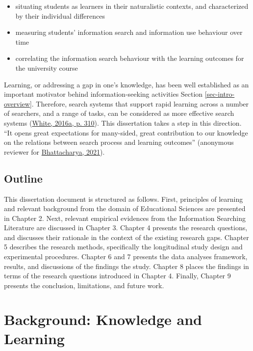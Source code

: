 \documentclass[letterpaper, nobind]{templates/ociamthesis}
\providecommand{\tightlist}{%
  \setlength{\itemsep}{0pt}\setlength{\parskip}{0pt}}
\begin{document}
\begin{itemize}
\tightlist
\item
  situating students as learners in their naturalistic contexts, and characterized by their individual differences
\item
  measuring students' information search and information use behaviour over time
\item
  correlating the information search behaviour with the learning outcomes for the university course
\end{itemize}

Learning, or addressing a gap in one's knowledge, has been well established as an important motivator behind information-seeking activities
Section \ref{sec-intro-overview}.
Therefore, search systems that support rapid learning across a number of searchers, and a range of tasks, can be considered as more effective search systems (\protect\hyperlink{ref-white2016interactions}{White, 2016a, p. 310}).
This dissertation takes a step in this direction.
``It opens great expectations for many-sided, great contribution to our knowledge on the relations between search process and learning outcomes'' (anonymous reviewer for \protect\hyperlink{ref-bhattacharya2021longitudinal}{Bhattacharya, 2021}).

\hypertarget{sec-intro-outline}{%
\section{Outline}\label{sec-intro-outline}}

This dissertation document is structured as follows.
First, principles of learning and relevant background from the domain of Educational Sciences are presented in Chapter 2.
Next, relevant empirical evidences from the Information Searching Literature are discussed in Chapter 3.
Chapter 4 presents the research questions,
and discusses their rationale in the context of
the existing research gaps.
Chapter 5 describes the research methods, specifically the longitudinal study design and experimental procedures.
Chapter 6 and 7 presents the data analyses framework, results, and discussions of the findings the study.
Chapter 8 places the findings in terms of the research questions introduced in Chapter 4.
Finally, Chapter 9 presents the conclusion, limitations, and future work.

\hypertarget{ch-bg-learn}{%
\chapter{Background: Knowledge and Learning}\label{ch-bg-learn}}
\end{document}
